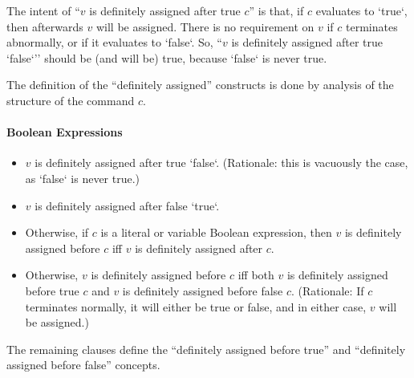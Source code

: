 The intent of ``$v$ is definitely assigned after true $c$'' is that, if $c$
evaluates to \xcd`true`, then afterwards $v$ will be assigned.  There is no
requirement on $v$ if $c$ terminates abnormally, or if it evaluates to
\xcd`false`.  So, ``$v$ is definitely assigned after true \xcd`false`'' should
be (and will be) true, because \xcd`false` is never true.

The definition of the ``definitely assigned'' constructs is done by analysis
of the structure of the command $c$.

\paragraph{Boolean Expressions}

\begin{itemize}
\item $v$ is definitely assigned after true \xcd`false`.
      (Rationale: this is vacuously the case, as \xcd`false` is never true.) 
\item $v$ is definitely assigned after false \xcd`true`.  
\item Otherwise, if $c$ is a literal or variable Boolean expression, 
      then  $v$ is definitely assigned before $c$ iff $v$ is definitely
      assigned after $c$.
\item Otherwise, $v$ is definitely assigned before $c$ iff 
      both $v$ is definitely assigned before true $c$ 
      and $v$ is definitely assigned before false $c$.
      (Rationale: If $c$ terminates normally, it will either be true or false,
      and in either case, $v$ will be assigned.)
\end{itemize}

The remaining clauses define the ``definitely assigned before true'' and
``definitely assigned before false'' concepts.

